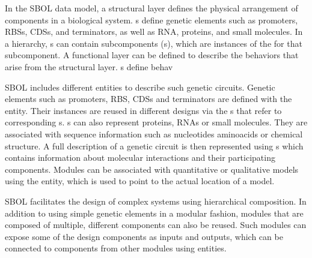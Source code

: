 
In the SBOL data model, a structural layer defines the physical arrangement of components in a biological system.  s define genetic elements such as promoters, RBSs, CDSs, and terminators, as well as RNA, proteins, and small molecules.  In a hierarchy, s can contain subcomponents (s), which are instances of the  for that subcomponent.  A functional layer can be defined to describe the behaviors that arise from the structural layer.  s define behav


SBOL includes different entities to describe such genetic circuits. Genetic elements such as promoters, RBS, CDSs and terminators are defined with the  entity. Their instances are reused in different designs via the s that refer to corresponding s. s can also represent proteins, RNAs or small molecules. They are associated with sequence information such as nucleotides aminoacids or chemical structure. A full description of a genetic circuit is then represented using  s which contains information about molecular interactions and their participating components. Modules can be associated with quantitative or qualitative models using the  entity, which is used to point to the actual location of a model.


SBOL facilitates the design of complex systems using hierarchical composition. In addition to using simple genetic elements in a modular fashion, modules that are composed of multiple, different components can also be reused. Such modules can expose some of the design components as inputs and outputs, which can be connected to components from other modules using  entities.




